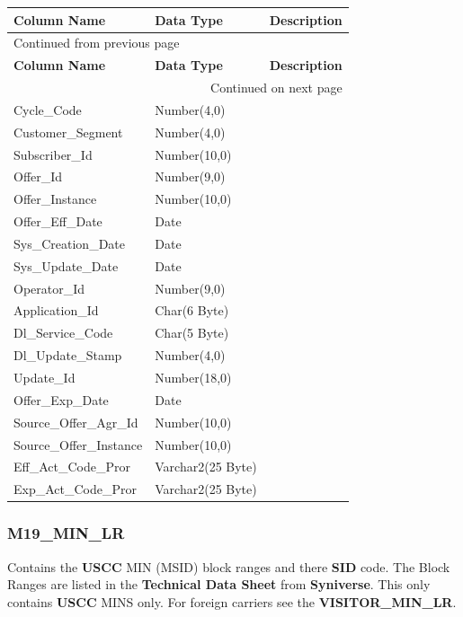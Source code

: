 \documentclass[12pt,twoside]{article}
\begin{document}
\begin{longtable}{l|l|l}
\hline
\textbf{Column Name} & \textbf{Data Type} & \textbf{Description}\\
\hline
\endfirsthead
\multicolumn{3}{l}{Continued from previous page} \\
\hline

\textbf{Column Name} & \textbf{Data Type} & \textbf{Description} \\

\hline
\endhead
\hline\multicolumn{3}{r}{Continued on next page} \\
\endfoot
\endlastfoot
\hline
Cycle\_Code & Number(4,0) & \\
Customer\_Segment & Number(4,0) & \\
Subscriber\_Id & Number(10,0) & \\
Offer\_Id & Number(9,0) & \\
Offer\_Instance & Number(10,0) & \\
Offer\_Eff\_Date & Date & \\
Sys\_Creation\_Date & Date & \\
Sys\_Update\_Date & Date & \\
Operator\_Id & Number(9,0) & \\
Application\_Id & Char(6 Byte) & \\
Dl\_Service\_Code & Char(5 Byte) & \\
Dl\_Update\_Stamp & Number(4,0) & \\
Update\_Id & Number(18,0) & \\
Offer\_Exp\_Date & Date & \\
Source\_Offer\_Agr\_Id & Number(10,0) & \\
Source\_Offer\_Instance & Number(10,0) & \\
Eff\_Act\_Code\_Pror & Varchar2(25 Byte) & \\
Exp\_Act\_Code\_Pror & Varchar2(25 Byte) & \\
\hline
\end{longtable}
\normalsize

\subsubsection{M19\_MIN\_LR}
\label{sec:orgheadline99}
Contains the \textbf{USCC} MIN (MSID) block ranges and there \textbf{SID}
code. The Block Ranges are listed in the \textbf{Technical Data Sheet}
from \textbf{Syniverse}. This only contains \textbf{USCC} MINS only. For
foreign carriers see the \textbf{VISITOR\_MIN\_LR}.
\footnotesize
\end{document}
